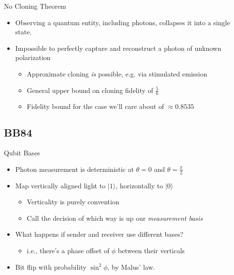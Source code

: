 \documentclass[pdf]{beamer}
\begin{document}
\begin{frame}{No Cloning Theorem}
  \begin{itemize}
  \item Observing a quantum entity, including photons, collapses it into a
    single state.
  \item Impossible to perfectly capture and reconstruct a photon of
    unknown polarization
    \begin{itemize}
    \item Approximate cloning \emph{is} possible, e.g. via stimulated emission
    \item General upper bound on cloning fidelity of $\frac{5}{6}$
    \item Fidelity bound for the case we'll care about of $\approx 0.8535$
    \end{itemize}
  \end{itemize}
\end{frame}

\subsection{BB84}
\begin{frame}{Qubit Bases}
  \begin{itemize}
  \item Photon measurement is deterministic at $\theta=0$ and $\theta=\frac{\pi}{2}$
  \item Map vertically aligned light to $|1\rangle$, horizontally to $|0\rangle$
    \begin{itemize}
    \item Verticality is purely convention
    \item Call the decision of which way is up our \emph{measurement basis}
    \end{itemize}
  \item What happens if sender and receiver use different bases?
    \begin{itemize}
    \item i.e., there's a phase offset of $\phi$ between their verticals
    \end{itemize}
  \item Bit flip with probability $\sin^2 \phi$, by Malus' law.
  \end{itemize}
\end{frame}
\end{document}
